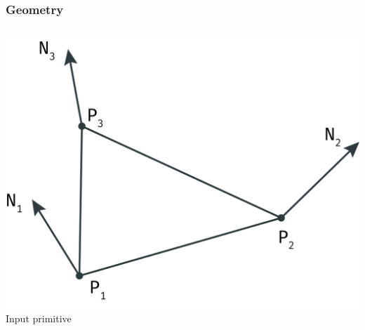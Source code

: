 	\begin{frame}\frametitle{Geometry}
		\begin{columns}
			\begin{column}{0.6\textwidth}
				\begin{center}
					\includegraphics[width=\textwidth]{img/1_single/inputPrimitive.png}
					\small{Input primitive}
				\end{center}
			\end{column}
		\end{columns}
	\end{frame}

